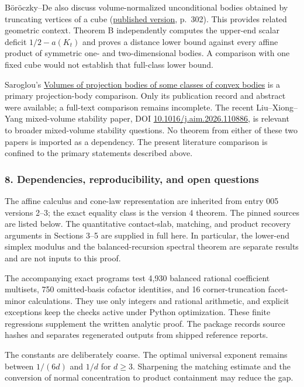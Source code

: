 \documentclass[
  11pt,
]{article}
\begin{document}
Böröczky--De also discuss volume-normalized unconditional bodies
obtained by truncating vertices of a cube
(\href{https://real.mtak.hu/196592/1/1-s2.0-S0022039621004393-main.pdf}{published
version}, p.~302). This provides related geometric context. Theorem B
independently computes the upper-end scalar deficit \(1/2-a(K_t)\) and
proves a distance lower bound against every affine product of symmetric
one- and two-dimensional bodies. A comparison with one fixed cube would
not establish that full-class lower bound.

Saroglou's \href{https://doi.org/10.1112/S0025579311001860}{Volumes of
projection bodies of some classes of convex bodies} is a primary
projection-body comparison. Only its publication record and abstract
were available; a full-text comparison remains incomplete. The recent
Liu--Xiong--Yang mixed-volume stability paper, DOI
\href{https://doi.org/10.1016/j.aim.2026.110886}{10.1016/j.aim.2026.110886},
is relevant to broader mixed-volume stability questions. No theorem from
either of these two papers is imported as a dependency. The present
literature comparison is confined to the primary statements described
above.

\subsubsection{8. Dependencies, reproducibility, and open
questions}\label{dependencies-reproducibility-and-open-questions}

The affine calculus and cone-law representation are inherited from entry
005 versions 2--3; the exact equality class is the version 4 theorem.
The pinned sources are listed below. The quantitative contact-slab,
matching, and product recovery arguments in Sections 3--5 are supplied
in full here. In particular, the lower-end simplex modulus and the
balanced-recursion spectral theorem are separate results and are not
inputs to this proof.

The accompanying exact programs test 4,930 balanced rational coefficient
multisets, 750 omitted-basis cofactor identities, and 16
corner-truncation facet-minor calculations. They use only integers and
rational arithmetic, and explicit exceptions keep the checks active
under Python optimization. These finite regressions supplement the
written analytic proof. The package records source hashes and separates
regenerated outputs from shipped reference reports.

The constants are deliberately coarse. The optimal universal exponent
remains between \(1/(6d)\) and \(1/d\) for \(d\ge3\). Sharpening the
matching estimate and the conversion of normal concentration to product
containment may reduce the gap.
\end{document}
